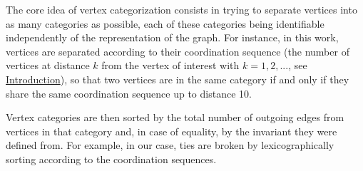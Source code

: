 \documentclass[main.tex]{subfiles}
\begin{document}
The core idea of vertex categorization consists in trying to separate vertices into as many categories as possible, each of these categories being identifiable independently of the representation of the graph. For instance, in this work, vertices are separated according to their coordination sequence (the number of vertices at distance $k$ from the vertex of interest with $k=1,2,...$, see \hyperref[coordinationsequence]{Introduction}), so that two vertices are in the same category if and only if they share the same coordination sequence up to distance 10.%

Vertex categories are then sorted by the total number of outgoing edges from vertices in that category and, in case of equality, by the invariant they were defined from. For example, in our case, ties are broken by lexicographically sorting according to the coordination sequences.%

%
\end{document}
